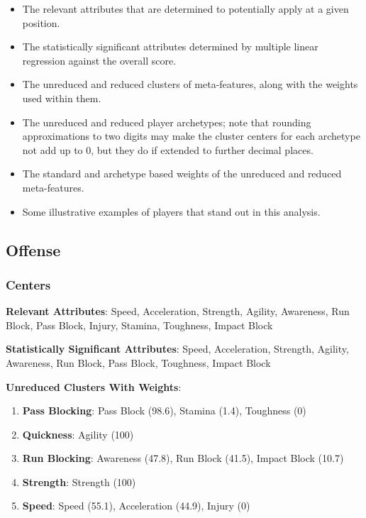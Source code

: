 \documentclass[11pt]{article}
\begin{document}
\begin{itemize}
\item The relevant attributes that are determined to potentially apply at a given position.
\item The statistically significant attributes determined by multiple linear regression against the overall score.
\item The unreduced and reduced clusters of meta-features, along with the weights used within them.
\item The unreduced and reduced player archetypes; note that rounding approximations to two digits may make the cluster centers for each archetype not add up to 0, but they do if extended to further decimal places.
\item The standard and archetype based weights of the unreduced and reduced meta-features.
\item Some illustrative examples of players that stand out in this analysis.
\end{itemize}

\subsection{Offense}
\subsubsection{Centers}

\textbf{Relevant Attributes}: Speed, Acceleration, Strength, Agility, Awareness, Run Block, Pass Block, Injury, Stamina, Toughness, Impact Block

\textbf{Statistically Significant Attributes}: Speed, Acceleration, Strength, Agility, Awareness, Run Block, Pass Block, Toughness, Impact Block

\textbf{Unreduced Clusters With Weights}:

\begin{enumerate}
\item{\textbf{Pass Blocking}}: Pass Block (98.6), Stamina (1.4), Toughness (0)
\item{\textbf{Quickness}}: Agility (100)
\item{\textbf{Run Blocking}}: Awareness (47.8), Run Block (41.5), Impact Block (10.7)
\item{\textbf{Strength}}: Strength (100)
\item{\textbf{Speed}}: Speed (55.1), Acceleration (44.9), Injury (0)
\end{enumerate}
\end{document}
